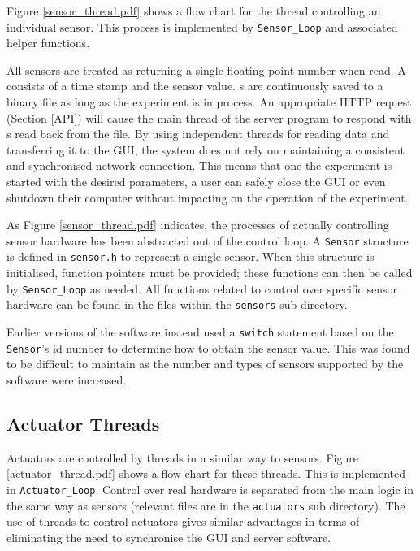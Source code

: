 Figure \ref{sensor_thread.pdf} shows a flow chart for the thread controlling an individual sensor. This process is implemented by \verb/Sensor_Loop/ and associated helper functions.

All sensors are treated as returning a single floating point number when read. A  consists of a time stamp and the sensor value. s are continuously saved to a binary file as long as the experiment is in process. An appropriate HTTP request (Section \ref{API}) will cause the main thread of the server program to respond with s read back from the file. By using independent threads for reading data and transferring it to the GUI, the system does not rely on maintaining a consistent and synchronised network connection. This means that one the experiment is started with the desired parameters, a user can safely close the GUI or even shutdown their computer without impacting on the operation of the experiment.



As Figure \ref{sensor_thread.pdf} indicates, the processes of actually controlling sensor hardware has been abstracted out of the control loop. A \verb/Sensor/ structure is defined in \verb/sensor.h/ to represent a single sensor. When this structure is initialised, function pointers must be provided; these functions can then be called by \verb/Sensor_Loop/ as needed. All functions related to control over specific sensor hardware can be found in the files within the \verb/sensors/ sub directory.

Earlier versions of the software instead used a \verb/switch/ statement based on the \verb/Sensor/'s id number to determine how to obtain the sensor value. This was found to be difficult to maintain as the number and types of sensors supported by the software were increased.



\subsection{Actuator Threads}\label{Actuator Thread}

Actuators are controlled by threads in a similar way to sensors. Figure \ref{actuator_thread.pdf} shows a flow chart for these threads. This is implemented in \verb/Actuator_Loop/. Control over real hardware is separated from the main logic in the same way as sensors (relevant files are in the \verb/actuators/ sub directory). The use of threads to control actuators gives similar advantages in terms of eliminating the need to synchronise the GUI and server software.

